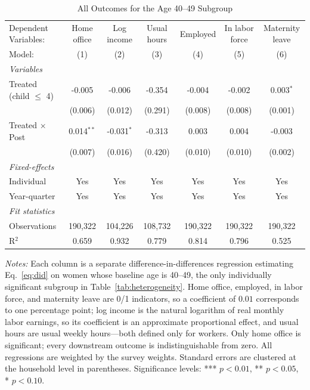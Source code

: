 
\begin{table}[H]
   \caption{\label{tab:age4049} All Outcomes for the Age 40--49 Subgroup}
   \centering
\footnotesize\setlength{\tabcolsep}{3pt}
   \begin{tabular}{lcccccc}
      \toprule
      Dependent Variables:      & Home office  & Log income   & Usual hours & Employed & In labor force & Maternity leave\\  
      Model:                    & (1)          & (2)          & (3)         & (4)      & (5)            & (6)\\  
      \midrule
      \emph{Variables}\\
      Treated (child $\leq$ 4)  & -0.005       & -0.006       & -0.354      & -0.004   & -0.002         & 0.003$^{*}$\\   
                                & (0.006)      & (0.012)      & (0.291)     & (0.008)  & (0.008)        & (0.001)\\   
\addlinespace[2pt]
      Treated $\times$ Post     & 0.014$^{**}$ & -0.031$^{*}$ & -0.313      & 0.003    & 0.004          & -0.003\\   
                                & (0.007)      & (0.016)      & (0.420)     & (0.010)  & (0.010)        & (0.002)\\   
\addlinespace[2pt]
      \midrule
      \emph{Fixed-effects}\\
      Individual                & Yes          & Yes          & Yes         & Yes      & Yes            & Yes\\  
      Year-quarter              & Yes          & Yes          & Yes         & Yes      & Yes            & Yes\\  
      \midrule
      \emph{Fit statistics}\\
      Observations              & 190,322      & 104,226      & 108,732     & 190,322  & 190,322        & 190,322\\  
      R$^2$                     & 0.659        & 0.932        & 0.779       & 0.814    & 0.796          & 0.525\\  
\bottomrule
   \end{tabular}
   
   \par \raggedright 
   \footnotesize\textit{Notes:} Each column is a separate difference-in-differences regression estimating Eq.~\eqref{eq:did} on women whose baseline age is 40--49, the only individually significant subgroup in Table~\ref{tab:heterogeneity}. Home office, employed, in labor force, and maternity leave are 0/1 indicators, so a coefficient of $0.01$ corresponds to one percentage point; log income is the natural logarithm of real monthly labor earnings, so its coefficient is an approximate proportional effect, and usual hours are usual weekly hours---both defined only for workers. Only home office is significant; every downstream outcome is indistinguishable from zero. All regressions are weighted by the survey weights. Standard errors are clustered at the household level in parentheses. Significance levels: *** $p<0.01$, ** $p<0.05$, * $p<0.10$.
\end{table}


